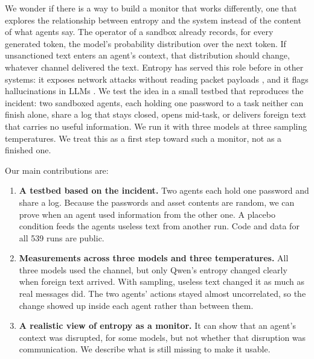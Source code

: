 We wonder if there is a way to build a monitor that works differently, one that explores the relationship between entropy and the system instead of the content of what agents say. The operator of a sandbox already records, for every generated token, the model's probability distribution over the next token. If unsanctioned text enters an agent's context, that distribution should change, whatever channel delivered the text. Entropy has served this role before in other systems: it exposes network attacks without reading packet payloads \parencite{shannon_ddos}, and it flags hallucinations in LLMs \parencite{shannon_hallucination}. We test the idea in a small testbed that reproduces the incident: two sandboxed agents, each holding one password to a task neither can finish alone, share a log that stays closed, opens mid-task, or delivers foreign text that carries no useful information. We run it with three models at three sampling temperatures. We treat this as a first step toward such a monitor, not as a finished one.

Our main contributions are:
\begin{enumerate}[leftmargin=*, itemsep=1pt, topsep=2pt]
  \item \textbf{A testbed based on the incident.} Two agents each hold one password and share a log. Because the passwords and asset contents are random, we can prove when an agent used information from the other one. A placebo condition feeds the agents useless text from another run. Code and data for all 539 runs are public.
  \item \textbf{Measurements across three models and three temperatures.} All three models used the channel, but only Qwen's entropy changed clearly when foreign text arrived. With sampling, useless text changed it as much as real messages did. The two agents' actions stayed almost uncorrelated, so the change showed up inside each agent rather than between them.
  \item \textbf{A realistic view of entropy as a monitor.} It can show that an agent's context was disrupted, for some models, but not whether that disruption was communication. We describe what is still missing to make it usable.
\end{enumerate}
